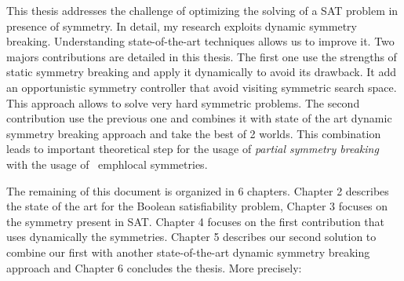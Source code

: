 %
%
%

This thesis addresses the challenge of optimizing the solving of a SAT problem in presence of
symmetry. In detail, my research exploits dynamic symmetry breaking.
Understanding state-of-the-art techniques allows us to improve it.
Two majors contributions are detailed in this thesis. The first one use the strengths of static symmetry 
breaking and apply it dynamically to avoid its drawback. It add an opportunistic symmetry controller 
that avoid visiting symmetric search space. This approach allows to solve very hard symmetric problems.
The second contribution use the previous one and combines it with state of the art dynamic 
symmetry breaking approach and take the best of 2 worlds. This combination leads to 
important theoretical step for the usage of \emph{partial symmetry breaking} with the usage of 
\ emph{local symmetries}. 
 


The remaining of this document is organized in 6 chapters. Chapter 2 describes the state of
the art for the Boolean satisfiability problem, Chapter 3 focuses on the symmetry present in SAT.
Chapter 4 focuses on the first contribution that uses dynamically the symmetries.
Chapter 5 describes our second solution to combine our first with another state-of-the-art  
dynamic symmetry breaking approach and Chapter 6 concludes the thesis. More precisely:
 
